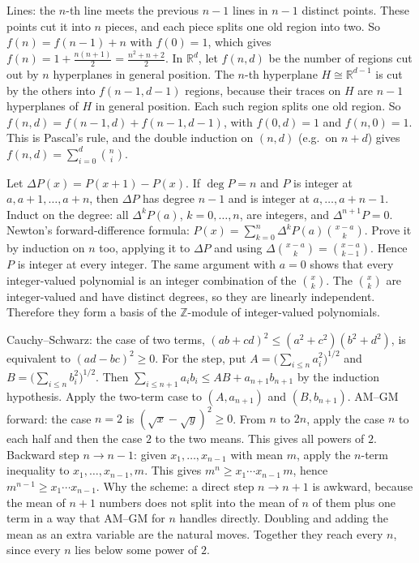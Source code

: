 \documentclass[11pt,a4paper]{article}
\begin{document}

 Lines: the $n$-th line meets the previous $n-1$ lines in $n-1$ distinct points. These points cut it into $n$ pieces, and each piece splits one old region into two. So $f(n)=f(n-1)+n$ with $f(0)=1$, which gives $f(n)=1+\frac{n(n+1)}2=\frac{n^2+n+2}2$.
 In $\mathbb R^d$, let $f(n,d)$ be the number of regions cut out by $n$ hyperplanes in general position. The $n$-th hyperplane $H\cong\mathbb R^{d-1}$ is cut by the others into $f(n-1,d-1)$ regions, because their traces on $H$ are $n-1$ hyperplanes of $H$ in general position. Each such region splits one old region.
 So $f(n,d)=f(n-1,d)+f(n-1,d-1)$, with $f(0,d)=1$ and $f(n,0)=1$. This is Pascal's rule, and the double induction on $(n,d)$ (e.g.\ on $n+d$) gives $f(n,d)=\sum_{i=0}^d\binom ni$.

 Let $\Delta P(x)=P(x+1)-P(x)$. If $\deg P=n$ and $P$ is integer at $a,a+1,\dots,a+n$, then $\Delta P$ has degree $n-1$ and is integer at $a,\dots,a+n-1$. Induct on the degree: all $\Delta^kP(a)$, $k=0,\dots,n$, are integers, and $\Delta^{n+1}P=0$.
 Newton's forward-difference formula: $P(x)=\sum_{k=0}^n\Delta^kP(a)\binom{x-a}k$. Prove it by induction on $n$ too, applying it to $\Delta P$ and using $\Delta\binom{x-a}{k}=\binom{x-a}{k-1}$. Hence $P$ is integer at every integer.
 The same argument with $a=0$ shows that every integer-valued polynomial is an integer combination of the $\binom xk$. The $\binom xk$ are integer-valued and have distinct degrees, so they are linearly independent. Therefore they form a basis of the $\mathbb Z$-module of integer-valued polynomials.

 Cauchy--Schwarz: the case of two terms, $(ab+cd)^2\le(a^2+c^2)(b^2+d^2)$, is equivalent to $(ad-bc)^2\ge0$. For the step, put $A=\big(\sum_{i\le n}a_i^2\big)^{1/2}$ and $B=\big(\sum_{i\le n}b_i^2\big)^{1/2}$. Then $\sum_{i\le n+1}a_ib_i\le AB+a_{n+1}b_{n+1}$ by the induction hypothesis. Apply the two-term case to $(A,a_{n+1})$ and $(B,b_{n+1})$.
 AM--GM forward: the case $n=2$ is $(\sqrt x-\sqrt y)^2\ge0$. From $n$ to $2n$, apply the case $n$ to each half and then the case $2$ to the two means. This gives all powers of $2$.
 Backward step $n\to n-1$: given $x_1,\dots,x_{n-1}$ with mean $m$, apply the $n$-term inequality to $x_1,\dots,x_{n-1},m$. This gives $m^n\ge x_1\cdots x_{n-1}\,m$, hence $m^{n-1}\ge x_1\cdots x_{n-1}$.
 Why the scheme: a direct step $n\to n+1$ is awkward, because the mean of $n+1$ numbers does not split into the mean of $n$ of them plus one term in a way that AM--GM for $n$ handles directly. Doubling and adding the mean as an extra variable are the natural moves. Together they reach every $n$, since every $n$ lies below some power of $2$.
\end{document}
